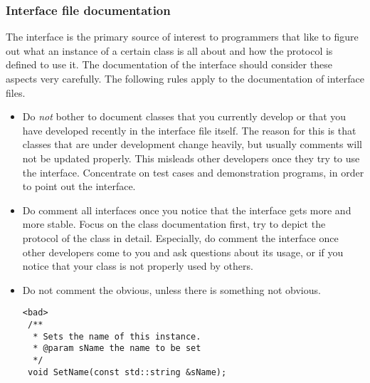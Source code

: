 \subsubsection{Interface file documentation}\label{sec:InterfaceDocumentation}
The interface is the primary source of interest to programmers that like to figure out what an instance of a certain class is all about and how the protocol is defined to use it.
The documentation of the interface should consider these aspects very carefully.
The following rules apply to the documentation of interface files.
\begin{itemize}
\item Do \emph{not} bother to document classes that you currently develop or that you have developed recently in the interface file itself. 
The reason for this is that classes that are under development change heavily, but usually comments will not be updated properly.
This misleads other developers once they try to use the interface.
Concentrate on test cases and demonstration programs, in order to point out the interface.
\item Do comment all interfaces once you notice that the interface gets more and more stable.
Focus on the class documentation first, try to depict the protocol of the class in detail.
Especially, do comment the interface once other developers come to you and ask questions about its usage, or if you notice that your class is not properly used by others.
\item Do not comment the obvious, unless there is something not obvious.
\begin{verbatim}
<bad>
 /**
  * Sets the name of this instance.
  * @param sName the name to be set
  */
 void SetName(const std::string &sName);
 

\end{verbatim}
\end{itemize}
